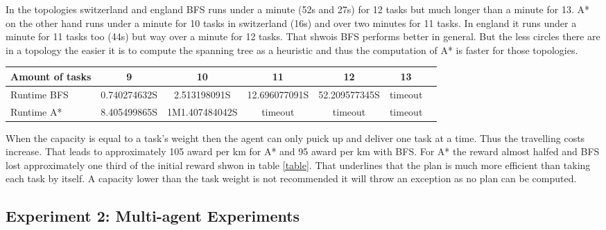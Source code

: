 \documentclass[11pt]{article}
\begin{document}
\begin{description}
In the topologies switzerland and england BFS runs under a minute (52s and 27s) for 12 tasks but much longer than a minute for 13. A* on the other hand runs under a minute for 10 tasks in switzerland (16s) and over two minutes for 11 tasks. In england it runs under a minute for 11 tasks too (44s) but way over a minute for 12 tasks. That shwois BFS performs better in general. But the less circles there are in a topology the easier it is to compute the spanning tree as a heuristic and thus the computation of A* is faster for those topologies.


\begin{table*}

\centering

\begin{tabular}{l*{5}{c}r}

Amount of tasks         & 9  & 10 & 11& 12&13 \\

\hline

Runtime BFS  
 &	0.740274632S 
&2.513198091S
& 12.696077091S
&52.209577345S&timeout\\

Runtime A*   
&8.405499865S&1M1.407484042S&timeout&timeout&timeout\\


\end{tabular}





\caption{Runtime in seconds for BFS and A*}

\label{table} 

\end{table*}

\item[Limitations] When the capacity is equal to a task's weight then the agent can only puick up and deliver one task at a time. Thus the travelling costs increase. That leads to approximately 105 award per km for A* and 95 award per km with BFS. For A* the reward almost halfed and BFS lost approximately one third of the initial reward shwon in table  \ref{table}. That underlines that the plan is much more efficient than taking each task by itself. A capacity lower than the task weight is not recommended it will throw an exception as no plan can be computed.

\end{description}


\subsection{Experiment 2: Multi-agent Experiments}
\end{document}
